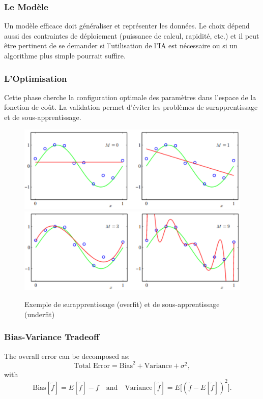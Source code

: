 \documentclass{article}
\begin{document}
\subsubsection{Le Modèle}
Un modèle efficace doit généraliser et représenter les données. Le choix dépend aussi des contraintes de déploiement (puissance de calcul, rapidité, etc.) et il peut être pertinent de se demander si l'utilisation de l'IA est nécessaire ou si un algorithme plus simple pourrait suffire.

\subsubsection{L’Optimisation}
Cette phase cherche la configuration optimale des paramètres dans l’espace de la fonction de coût. La validation permet d’éviter les problèmes de surapprentissage et de sous-apprentissage.

\begin{figure}[ht]
    \centering
    \includegraphics[width=\linewidth]{graphics/S2Intro/sous-apprentissage.PNG}
    \includegraphics[width=\linewidth]{graphics/S2Intro/sur-apprentissage.PNG}
    \caption{Exemple de surapprentissage (overfit) et de sous-apprentissage (underfit)}
    \label{fig:over-under-fit}
\end{figure}

\subsubsection{Bias-Variance Tradeoff}
The overall error can be decomposed as:
\[
\text{Total Error} = \text{Bias}^2 + \text{Variance} + \sigma^2,
\]
with
\[
\text{Bias}[\tilde{f}] = E[\tilde{f}] - f \quad \text{and} \quad \text{Variance}[\tilde{f}] = E\big[(\tilde{f} - E[\tilde{f}])^2\big].
\]
\end{document}
